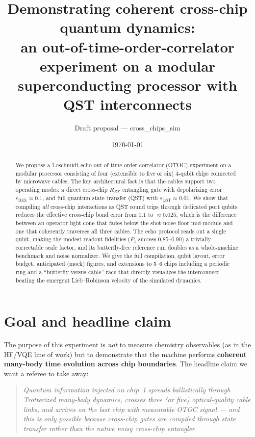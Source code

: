 \documentclass[11pt]{article}
\title{Demonstrating coherent cross-chip quantum dynamics:\\
an out-of-time-order-correlator experiment on a modular\\
superconducting processor with QST interconnects}
\author{Draft proposal --- cross\_chips\_sim}
\date{\today}
\newcommand{\eqst}{\varepsilon_{\mathrm{QST}}}
\newcommand{\erzx}{\varepsilon_{\mathrm{RZX}}}
\begin{document}
\maketitle

\begin{abstract}
We propose a Loschmidt-echo out-of-time-order-correlator (OTOC) experiment on a
modular processor consisting of four (extensible to five or six) 4-qubit chips
connected by microwave cables. The key architectural fact is that the cables
support two operating modes: a direct cross-chip $R_{ZX}$ entangling gate with
depolarizing error $\erzx \approx 0.1$, and full quantum state transfer (QST)
with $\eqst \approx 0.01$. We show that compiling \emph{all} cross-chip
interactions as QST round trips through dedicated port qubits reduces the
effective cross-chip bond error from $0.1$ to $\approx 0.025$, which is the
difference between an operator light cone that fades below the shot-noise
floor mid-module and one that coherently traverses all three cables. The echo protocol reads out a
single qubit, making the modest readout fidelities ($P_1$ success
$0.85$--$0.90$) a trivially correctable scale factor, and its butterfly-free
reference run doubles as a whole-machine benchmark and noise normalizer. We
give the full compilation, qubit layout, error budget, anticipated
(mock) figures, and extensions to 5--6 chips including a periodic ring and a
``butterfly versus cable'' race that directly visualizes the interconnect
beating the emergent Lieb--Robinson velocity of the simulated dynamics.
\end{abstract}

\section{Goal and headline claim}

The purpose of this experiment is \emph{not} to measure chemistry observables
(as in the HF/VQE line of work) but to demonstrate that the machine performs
\textbf{coherent many-body time evolution across chip boundaries}. The headline
claim we want a referee to take away:

\begin{quote}
\emph{Quantum information injected on chip~1 spreads ballistically through
Trotterized many-body dynamics, crosses three (or five) optical-quality cable
links, and arrives on the last chip with measurable OTOC signal --- and this is
only possible because cross-chip gates are compiled through state transfer
rather than the native noisy cross-chip entangler.}
\end{quote}
\end{document}
